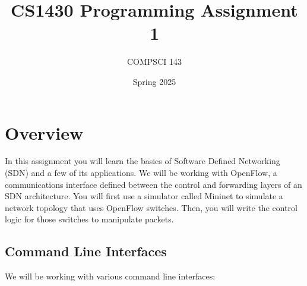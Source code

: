 \documentclass{article}
\title{CS1430 Programming Assignment 1}
\author{COMPSCI 143}
\date{Spring 2025}
\begin{document}
\pagestyle{plain}

\pagestyle{fancy}


\section{Overview}
In this assignment you will learn the basics of Software Defined Networking (SDN) and a few of its applications.
We will be working with OpenFlow, a communications interface defined between the control and forwarding layers of an SDN architecture.
You will first use a simulator called Mininet to simulate a network topology that uses OpenFlow switches.
Then, you will write the control logic for those switches to manipulate packets.

\subsection{Command Line Interfaces}
We will be working with various command line interfaces:
\end{document}
